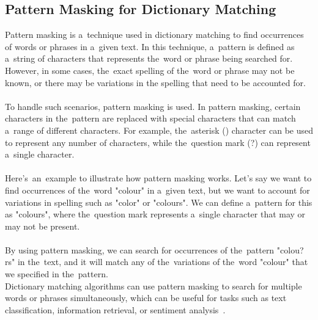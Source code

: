 \subsection{Pattern Masking for Dictionary Matching}\label{subsec:pmdm}
Pattern masking is a~technique used in dictionary matching to find occurrences of words or phrases in a~given text.
In this technique, a~pattern  is defined as a~string of characters that represents the~word or phrase being searched for.
However, in some cases, the~exact spelling of the~word or phrase may not be known, or there may be variations in the
spelling that need to be accounted for.\\
\\
To handle such scenarios, pattern masking is used. In pattern masking, certain characters in the~pattern are replaced
with special characters that can match a~range of different characters. For example, the~asterisk (\*) character can be
used to represent any number of characters, while the~question mark (?) can represent a~single character.\\
\\
Here's~an~example to illustrate how pattern masking works. Let's say we want to find occurrences of the~word
"colour" in a~given text, but we want to account for variations in spelling such as "color" or "colours".
We can define a~pattern for this as "colours", where the~question mark represents a~single character that
may or may not be present.\\
\\
By using pattern masking, we can search for occurrences of the~pattern "colou?rs" in the~text, and it will match
any of the~variations of the~word "colour" that we specified in the~pattern.\\
Dictionary matching algorithms can use pattern masking to search for multiple words or phrases simultaneously,
which can be useful for tasks such as text classification, information retrieval, or sentiment analysis~\cite{pmdm}.
